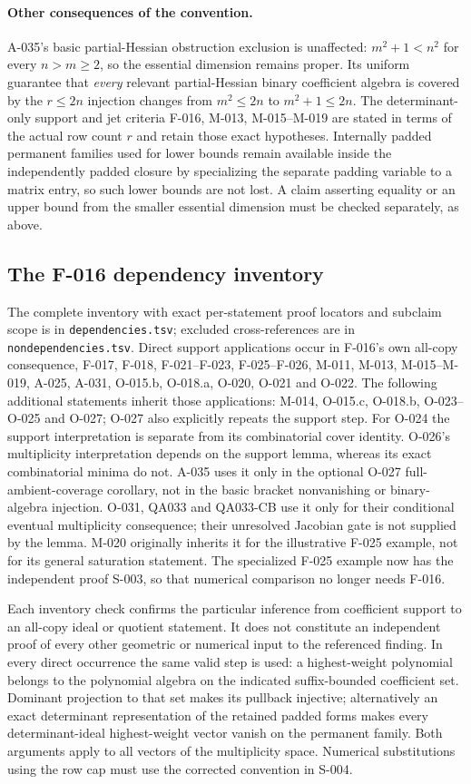 \paragraph{Other consequences of the convention.}
A-035's basic partial-Hessian obstruction exclusion is unaffected:
$m^2+1<n^2$ for every $n>m\geq2$, so the essential dimension remains
proper. Its uniform guarantee that \emph{every} relevant partial-Hessian
binary coefficient algebra is covered by the $r\leq2n$ injection changes
from $m^2\leq2n$ to $m^2+1\leq2n$. The determinant-only support and jet
criteria F-016, M-013, M-015--M-019 are stated in terms of the actual row
count $r$ and retain those exact hypotheses. Internally padded permanent
families used for lower bounds remain available inside the independently
padded closure by specializing the separate padding variable to a matrix
entry, so such lower bounds are not lost. A claim asserting equality or
an upper bound from the smaller essential dimension must be checked
separately, as above.

\subsection{The F-016 dependency inventory}
The complete inventory with exact per-statement proof locators and
subclaim scope is in \texttt{dependencies.tsv}; excluded cross-references
are in \texttt{nondependencies.tsv}. Direct support applications occur
in F-016's own all-copy consequence, F-017, F-018, F-021--F-023,
F-025--F-026, M-011, M-013, M-015--M-019, A-025, A-031,
O-015.b, O-018.a, O-020, O-021 and O-022. The following additional
statements inherit those applications: M-014, O-015.c, O-018.b,
O-023--O-025 and O-027; O-027 also explicitly repeats the support step.
For O-024 the support interpretation is separate from its combinatorial
cover identity. O-026's multiplicity interpretation depends on the
support lemma, whereas its exact combinatorial minima do not.
A-035 uses it only in the optional O-027 full-ambient-coverage corollary,
not in the basic bracket nonvanishing or binary-algebra injection.
O-031, QA033 and QA033-CB use it only for their conditional eventual
multiplicity consequence; their unresolved Jacobian gate is not supplied
by the lemma. M-020 originally inherits it for the illustrative F-025
example, not for its general saturation statement. The specialized
F-025 example now has the independent proof S-003, so that numerical
comparison no longer needs F-016.

Each inventory check confirms the particular inference from coefficient
support to an all-copy ideal or quotient statement. It does not constitute
an independent proof of every other geometric or numerical input to the
referenced finding. In every direct occurrence the same valid step is
used: a highest-weight polynomial belongs to the polynomial algebra on
the indicated suffix-bounded coefficient set. Dominant projection to
that set makes its pullback injective; alternatively an exact determinant
representation of the retained padded forms makes every determinant-ideal
highest-weight vector vanish on the permanent family. Both arguments
apply to all vectors of the multiplicity space. Numerical substitutions
using the row cap must use the corrected convention in S-004.

